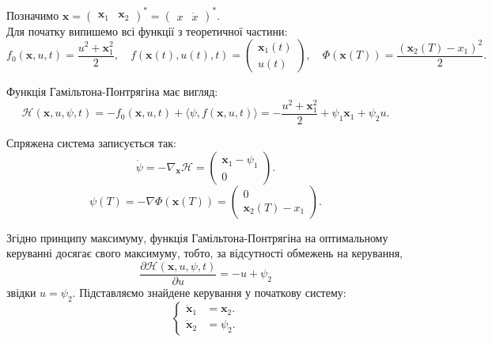 \begin{solution}
	Позначимо $\textbf{x} = \begin{pmatrix} \textbf{x}_1 & \textbf{x}_2 \end{pmatrix}^* = \begin{pmatrix} x & \dot x \end{pmatrix}^*$. \\

	Для початку випишемо всі функції з теоретичної частини:
	\begin{equation}
		f_0(\textbf{x}, u, t) = \dfrac{u^2 + \textbf{x}_1^2}{2}, \quad f(\textbf{x}(t), u(t), t) = \begin{pmatrix} \textbf{x}_1(t) \\ u(t) \end{pmatrix}, \quad \Phi(\textbf{x}(T)) = \dfrac{(\textbf{x}_2(T) - x_1)^2}{2}.
	\end{equation}

	Функція Гамільтона-Понтрягіна має вигляд:
	\begin{equation}
		\mathcal{H}(\textbf{x}, u, \psi, t) = - f_0(\textbf{x}, u, t) + \langle \psi, f(\textbf{x}, u, t) \rangle = - \dfrac{u^2 + \textbf{x}_1^2}{2} + \psi_1 \textbf{x}_1 + \psi_2 u.
	\end{equation}

	Спряжена система записується так:
	\begin{equation}
		\dot \psi = - \nabla_\textbf{x} \mathcal{H} = \begin{pmatrix} \textbf{x}_1 - \psi_1 \\ 0 \end{pmatrix}.
	\end{equation}
	\begin{equation}
		\psi(T) = - \nabla \Phi(\textbf{x}(T)) = \begin{pmatrix} 0 \\ \textbf{x}_2(T) - x_1 \end{pmatrix}.
	\end{equation}

	Згідно принципу максимуму, функція Гамільтона-Понтрягіна на оптимальному керуванні досягає свого максимуму, тобто, за відсутності обмежень на керування,
	\begin{equation}
    	\dfrac{\partial \mathcal{H}(\textbf{x}, u, \psi, t)}{\partial u} = - u + \psi_2
	\end{equation}
	звідки $u = \psi_2$. Підставляємо знайдене керування у початкову систему:
	\[ \left\{ \begin{aligned}
	    \dot{\textbf{x}}_1 &= \textbf{x}_2. \\
	    \dot{\textbf{x}}_2 &= \psi_2.
	\end{aligned} \right. \]
\end{solution}

